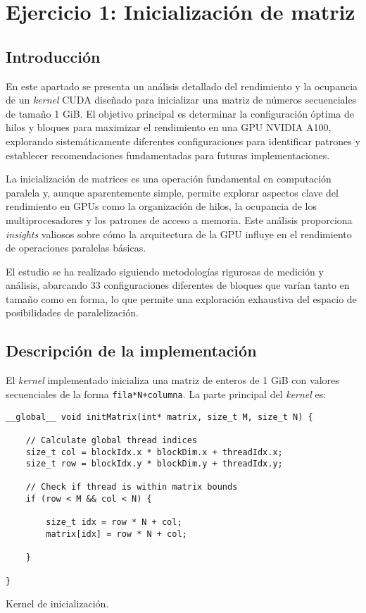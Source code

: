 \chapter{Ejercicio 1: Inicialización de matriz}

\section{Introducción}

    En este apartado se presenta un análisis detallado del rendimiento y la ocupancia de un \textit{kernel} CUDA diseñado para inicializar una matriz de números secuenciales de tamaño 1 GiB. El objetivo principal es determinar la configuración óptima de hilos y bloques para maximizar el rendimiento en una GPU NVIDIA A100, explorando sistemáticamente diferentes configuraciones para identificar patrones y establecer recomendaciones fundamentadas para futuras implementaciones.
    
    La inicialización de matrices es una operación fundamental en computación paralela y, aunque aparentemente simple, permite explorar aspectos clave del rendimiento en GPUs como la organización de hilos, la ocupancia de los multiprocesadores y los patrones de acceso a memoria. Este análisis proporciona \textit{insights} valiosos sobre cómo la arquitectura de la GPU influye en el rendimiento de operaciones paralelas básicas.
    
    El estudio se ha realizado siguiendo metodologías rigurosas de medición y análisis, abarcando 33 configuraciones diferentes de bloques que varían tanto en tamaño como en forma, lo que permite una exploración exhaustiva del espacio de posibilidades de paralelización.

\newpage

\section{Descripción de la implementación}

    El \textit{kernel} implementado inicializa una matriz de enteros de 1 GiB con valores secuenciales de la forma \texttt{fila*N+columna}. La parte principal del \textit{kernel} es:

    \begin{listing}[h]
        \begin{verbatim}
__global__ void initMatrix(int* matrix, size_t M, size_t N) {
        
    // Calculate global thread indices
    size_t col = blockIdx.x * blockDim.x + threadIdx.x;
    size_t row = blockIdx.y * blockDim.y + threadIdx.y;

    // Check if thread is within matrix bounds
    if (row < M && col < N) {

        size_t idx = row * N + col;
        matrix[idx] = row * N + col;

    }

}
        \end{verbatim}
        \caption{Kernel de inicialización.}
    \end{listing}
    
